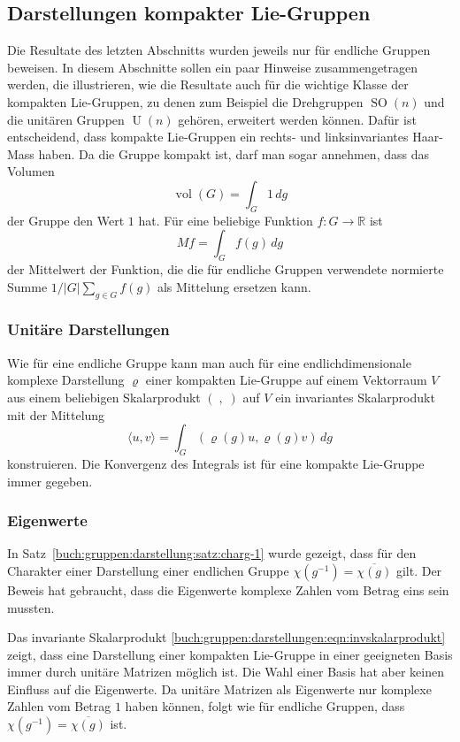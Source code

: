 %
%
\subsection{Darstellungen kompakter Lie-Gruppen}
Die Resultate des letzten Abschnitts wurden jeweils nur für endliche Gruppen
beweisen.
In diesem Abschnitte sollen ein paar Hinweise zusammengetragen werden,
die illustrieren, wie die Resultate auch für die wichtige Klasse
der kompakten Lie-Gruppen, zu denen zum Beispiel die Drehgruppen
$\operatorname{SO}(n)$ und die unitären Gruppen $\operatorname{U}(n)$
gehören, erweitert werden können.
Dafür ist entscheidend, dass kompakte Lie-Gruppen ein rechts- und
linksinvariantes Haar-Mass haben.
Da die Gruppe kompakt ist, darf man sogar annehmen, dass das
Volumen
\[
\operatorname{vol}(G)
=
\int_G 1\, dg
\]
der Gruppe den Wert $1$ hat.
Für eine beliebige Funktion $f\colon G\to \mathbb{R}$ ist
\[
Mf
=
\int_G f(g)\,dg
\]
der Mittelwert der Funktion, die die für endliche Gruppen verwendete
normierte Summe $1/|G| \sum_{g\in G}f(g)$ als Mittelung ersetzen kann.

%
%
\subsubsection{Unitäre Darstellungen}
Wie für eine endliche Gruppe kann man auch für eine endlichdimensionale
komplexe Darstellung $\varrho$ einer kompakten Lie-Gruppe auf einem
Vektorraum $V$ aus einem beliebigen Skalarprodukt $(\;,\;)$ auf $V$
ein invariantes Skalarprodukt mit der Mittelung
\begin{equation}
\langle u,v\rangle
=
\int_G (\varrho(g)u,\varrho(g)v)\,dg
\label{buch:gruppen:darstellungen:eqn:invskalarprodukt}
\end{equation}
konstruieren.
Die Konvergenz des Integrals ist für eine kompakte Lie-Gruppe immer 
gegeben.


%
%
\subsubsection{Eigenwerte}
In Satz~\ref{buch:gruppen:darstellung:satz:charg-1} wurde gezeigt,
dass für den Charakter einer Darstellung einer endlichen Gruppe
$\chi(g^{-1})=\overline{\chi(g)}$ gilt.
Der Beweis hat gebraucht, dass die Eigenwerte komplexe Zahlen vom
Betrag eins sein mussten.

Das invariante Skalarprodukt
\eqref{buch:gruppen:darstellungen:eqn:invskalarprodukt}
zeigt, dass eine Darstellung einer kompakten Lie-Gruppe in einer
geeigneten Basis immer durch unitäre Matrizen möglich ist.
Die Wahl einer Basis hat aber keinen Einfluss auf die Eigenwerte.
Da unitäre Matrizen als Eigenwerte nur komplexe Zahlen vom Betrag $1$
haben können, folgt wie für endliche Gruppen, dass
$\chi(g^{-1})=\overline{\chi(g)}$ ist.

